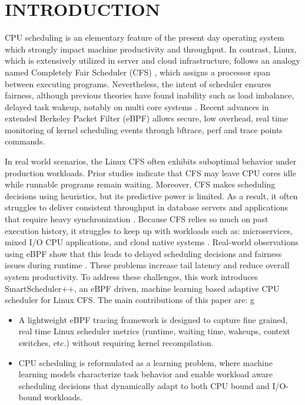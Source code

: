 \documentclass{llncs}
\begin{document}
\section{INTRODUCTION}
CPU scheduling is an elementary feature of the present day operating system which strongly impact \cite{seelam2024comparative} machine productivity and throughput. In contrast, Linux, which is extensively utilized in server and cloud infrastructure, follows an analogy named Completely Fair Scheduler (CFS) \cite{LinuxCFSvsWindows2020}, which assigns a processor span between executing programs. Nevertheless, the intent of scheduler ensures fairness, although previous theories have found inability such as load imbalance, delayed task wakeup, notably on multi core systems \cite{goel2025performance}. Recent advances in extended Berkeley Packet Filter (eBPF) allows secure, low overhead, real time monitoring of kernel scheduling events through bftrace, perf and trace points commands. 

In real world scenarios, the Linux CFS often exhibits suboptimal behavior under production workloads. Prior studies \cite{MLEngineCFS2022} indicate that CFS may leave CPU cores idle while runnable programs remain waiting. Moreover, CFS makes scheduling decisions using heuristics, but its predictive power is limited. As a result, it often struggles to deliver consistent throughput in database servers and applications that require heavy synchronization \cite{das2023linux}. Because CFS relies so much on past execution history, it struggles to keep up with workloads such as: microservices, mixed I/O CPU applications, and cloud native systems \cite{CFSFairnessEBPF2022}. Real-world observations using eBPF show that this leads to delayed scheduling decisions and fairness issues during runtime \cite{eBPFTechnology2021}. These problems increase tail latency and reduce overall system productivity. To address these challenges, this work introduces SmartScheduler++, an eBPF driven, machine learning based adaptive CPU scheduler for Linux CFS. The main contributions of this paper are: 
g\begin{itemize}
    \item A lightweight eBPF tracing framework is designed to capture fine grained, real time Linux scheduler metrics (runtime, waiting time, wakeups, context switches, etc.) without requiring kernel recompilation.
    \item CPU scheduling is reformulated as a learning problem, where machine learning models characterize task behavior and enable workload aware scheduling decisions that dynamically adapt to both CPU bound and I/O-bound workloads.
\end{itemize}
\end{document}
